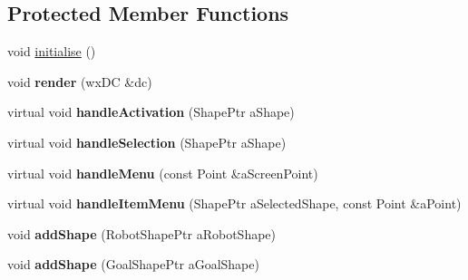 \subsection*{Protected Member Functions}
\begin{DoxyCompactItemize}
\item 
void \hyperlink{class_view_1_1_robot_world_canvas_a976c8eb03167bf9c9b0f911ff3e0fa9e}{initialise} ()
\item 
void {\bfseries render} (wx\+DC \&dc)\hypertarget{class_view_1_1_robot_world_canvas_a9cc3e904305ee1e99f916ecdcbd757b7}{}\label{class_view_1_1_robot_world_canvas_a9cc3e904305ee1e99f916ecdcbd757b7}

\item 
virtual void {\bfseries handle\+Activation} (Shape\+Ptr a\+Shape)\hypertarget{class_view_1_1_robot_world_canvas_a29d4e61d22b79fedaee17411b5f6b3c7}{}\label{class_view_1_1_robot_world_canvas_a29d4e61d22b79fedaee17411b5f6b3c7}

\item 
virtual void {\bfseries handle\+Selection} (Shape\+Ptr a\+Shape)\hypertarget{class_view_1_1_robot_world_canvas_a955374b23557c1459b597e457d68cf57}{}\label{class_view_1_1_robot_world_canvas_a955374b23557c1459b597e457d68cf57}

\item 
virtual void {\bfseries handle\+Menu} (const Point \&a\+Screen\+Point)\hypertarget{class_view_1_1_robot_world_canvas_a11ae3a4bc7c60fb560d42c1f63b8955b}{}\label{class_view_1_1_robot_world_canvas_a11ae3a4bc7c60fb560d42c1f63b8955b}

\item 
virtual void {\bfseries handle\+Item\+Menu} (Shape\+Ptr a\+Selected\+Shape, const Point \&a\+Point)\hypertarget{class_view_1_1_robot_world_canvas_a29edcdeeea1b21b5626b1f47fbe43871}{}\label{class_view_1_1_robot_world_canvas_a29edcdeeea1b21b5626b1f47fbe43871}

\item 
void {\bfseries add\+Shape} (Robot\+Shape\+Ptr a\+Robot\+Shape)\hypertarget{class_view_1_1_robot_world_canvas_a3156a2e906d30e96f9bf7ef9ff731b06}{}\label{class_view_1_1_robot_world_canvas_a3156a2e906d30e96f9bf7ef9ff731b06}

\item 
void {\bfseries add\+Shape} (Goal\+Shape\+Ptr a\+Goal\+Shape)\hypertarget{class_view_1_1_robot_world_canvas_afaa1fc0f2e6e76653ef7022853318646}{}\label{class_view_1_1_robot_world_canvas_afaa1fc0f2e6e76653ef7022853318646}


\end{DoxyCompactItemize}
